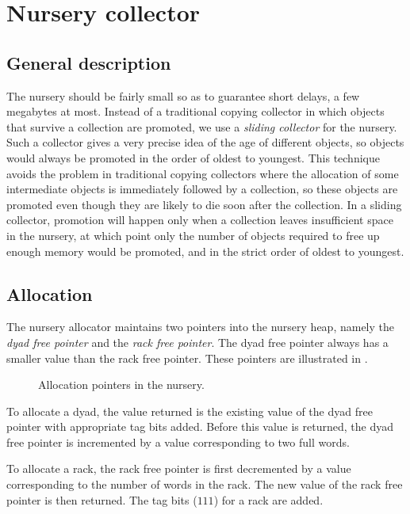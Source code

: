 \section{Nursery collector}

\subsection{General description}

The nursery should be fairly small so as to guarantee short delays, a
few megabytes at most.  Instead of a traditional copying collector in
which objects that survive a collection are promoted, we use a
\emph{sliding collector} for the nursery.  Such a collector gives a
very precise idea of the age of different objects, so objects would
always be promoted in the order of oldest to youngest.  This
technique avoids the problem in traditional copying collectors where
the allocation of some intermediate objects is immediately followed by
a collection, so these objects are promoted even though they are
likely to die soon after the collection.  In a sliding collector,
promotion will happen only when a collection leaves insufficient space
in the nursery, at which point only the number of objects required to
free up enough memory would be promoted, and in the strict order of
oldest to youngest.

\subsection{Allocation}

The nursery allocator maintains two pointers into the nursery heap,
namely the \emph{dyad free pointer} and the \emph{rack free
  pointer}.  The dyad free pointer always has a smaller value than
the rack free pointer.  These pointers are illustrated in
.

\begin{figure}
\begin{center}
\end{center}
\caption{\label{fig-nursery-pointers}
Allocation pointers in the nursery.}
\end{figure}

To allocate a dyad, the value returned is the existing value of the
dyad free pointer with appropriate tag bits added.  Before this value
is returned, the dyad free pointer is incremented by a value
corresponding to two full words.

To allocate a rack, the rack free pointer is first decremented by a
value corresponding to the number of words in the rack.  The new value
of the rack free pointer is then returned.  The tag bits ($111$) for a
rack are added.


